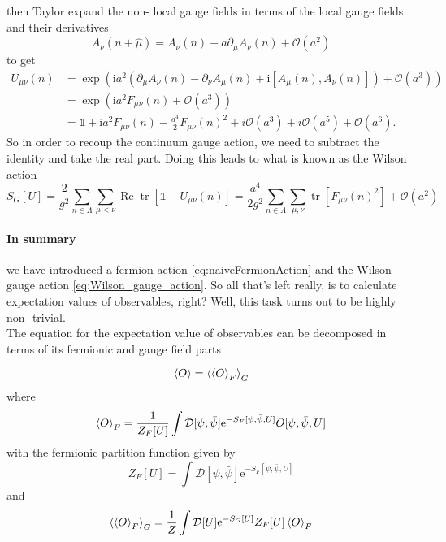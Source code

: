 \documentclass[a4paper,10pt]{article}
\begin{document}
then Taylor expand the non- local gauge fields in terms of the local gauge fields and their derivatives 
\begin{equation}
A_{\nu}(n+\hat{\mu})=A_{\nu}(n)+a \partial_{\mu} A_{\nu}(n)+\mathcal{O}\left(a^{2}\right)
\end{equation}
to get
\begin{equation}
\begin{aligned}
U_{\mu \nu}(n) &=\exp \left(\mathrm{i} a^{2}\left(\partial_{\mu} A_{\nu}(n)-\partial_{\nu} A_{\mu}(n)+\mathrm{i}\left[A_{\mu}(n), A_{\nu}(n)\right]\right)+\mathcal{O}\left(a^{3}\right)\right) \\
&=\exp \left(\mathrm{i} a^{2} F_{\mu \nu}(n)+\mathcal{O}\left(a^{3}\right)\right)\\
&=\mathbb{1} + \mathrm{i} a^{2} F_{\mu \nu}(n) - \frac{a^4}{2}F_{\mu \nu}(n)^2+i\mathcal{O}\left(a^{3}\right)+i\mathcal{O}\left(a^{5}\right)+\mathcal{O}\left(a^{6}\right).
\end{aligned}
\end{equation}
So in order to recoup the continuum gauge action, we need to subtract the identity and take the real part. Doing this leads to what is known as the Wilson action
\begin{equation}\label{eq:Wilson_gauge_action}
S_{G}[U]=\frac{2}{g^{2}} \sum_{n \in \Lambda} \sum_{\mu<\nu} \operatorname{Re} \operatorname{tr}\left[\mathbb{1}-U_{\mu \nu}(n)\right]=\frac{a^{4}}{2 g^{2}} \sum_{n \in \Lambda} \sum_{\mu, \nu} \operatorname{tr}\left[F_{\mu \nu}(n)^{2}\right]+\mathcal{O}\left(a^{2}\right)
\end{equation}
\paragraph{In summary} we have introduced a fermion action \eqref{eq:naiveFermionAction} and the Wilson gauge action \eqref{eq:Wilson_gauge_action}. So all that's left really, is to calculate expectation values of observables, right? Well, this task turns out to be highly non- trivial.\\The equation for the expectation value of observables can be decomposed in terms of its fermionic and gauge field parts

\begin{equation}
\braket{O} = \braket{\braket{O}_F}_G
\end{equation}
where
\begin{equation}\label{eq:fermionic_expectationValue}
\braket{O}_{F}=\frac{1}{Z_{F}[U]} \int \mathcal{D}[\psi, \bar{\psi}] \mathrm{e}^{-S_{F}[\psi, \bar{\psi}, U]} O[\psi, \bar{\psi}, U]
\end{equation}
with the fermionic partition function given by
\begin{equation}
Z_{F}[U]=\int \mathcal{D}[\psi, \bar{\psi}] \mathrm{e}^{-S_{F}[\psi, \bar{\psi}, U]}
\end{equation}
and
\begin{equation}\label{eq:gluonic_On_fermionic_E_val}
\braket{\braket{O}_{F}}_G=\frac{1}{Z} \int \mathcal{D}[U] \mathrm{e}^{-S_{G}[U]} Z_{F}[U] \braket{O}_{F}
\end{equation}
\end{document}
